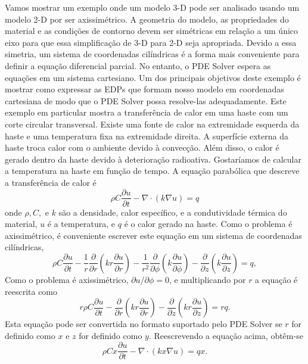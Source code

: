 \documentclass[12pt,oneside,a4paper]{abntex2}
\begin{document}
Vamos mostrar um exemplo onde um modelo 3-D pode ser analisado usando um modelo 2-D por ser axissimétrico. 
A geometria do modelo, as propriedades do material e as condições de contorno devem ser simétricas em relação a um único eixo para que essa simplificação de 3-D para 2-D seja apropriada. 
Devido a essa simetria, um sistema de coordenadas cilíndricas é a forma mais conveniente para definir a equação diferencial parcial. 
No entanto, o PDE Solver espera as equações em um sistema cartesiano. 
Um dos principais objetivos deste exemplo é mostrar como expressar as EDPs que formam nosso modelo em coordenadas cartesiana de modo que o PDE Solver possa resolve-las adequadamente.
Este exemplo em particular mostra a transferência de calor em uma haste com um corte circular transversal. Existe uma fonte de calor na extremidade esquerda da haste e uma temperatura fixa na extremidade direita. 
A superfície externa da haste troca calor com o ambiente devido à convecção. 
Além disso, o calor é gerado dentro da haste devido à deterioração radioativa.
Gostaríamos de calcular a temperatura na haste em função
de tempo. 
A equação parabólica que descreve a transferência de calor é
$$ \rho C \frac{\partial u}{\partial t} - \nabla \cdot (k \nabla u) = q$$
onde $\rho, C, $ e $k$ são a densidade, calor específico, e a condutividade térmica do material, $u$ é a temperatura, e
$q$ é o calor gerado na haste. Como o problema é axissimétrico, é conveniente escrever este
equação em um sistema de coordenadas cilíndricas,
$$ \rho C \frac{\partial u}{\partial t} - 
\frac{1}{r}\frac{\partial}{\partial r}\left(kr\frac{\partial u}{\partial r}\right)
- \frac{1}{r^2}\frac{\partial}{\partial \phi}\left(k\frac{\partial u}{\partial\phi}\right)
- \frac{\partial}{\partial z}\left(k\frac{\partial u}{\partial z}\right)
= q,
$$
Como o problema é axissimétrico, $\partial u/\partial\phi = 0$, e multiplicando por $r$ a equação é reescrita como
$$ r\rho C \frac{\partial u}{\partial t} -
\frac{\partial}{\partial r}\left(kr\frac{\partial u}{\partial r}\right)
- \frac{\partial}{\partial z}\left(kr\frac{\partial u}{\partial z}\right)
= rq.
$$ 
Esta equação pode ser convertida no formato suportado pelo PDE Solver se $ r $ for definido como $ x $ e $ z $ for definido como $ y $. Reescrevendo a equação acima, obtêm-se
$$ 
\rho Cx\frac{\partial u}{\partial t}
-\nabla\cdot(kx\nabla u) = qx.
$$
\end{document}
